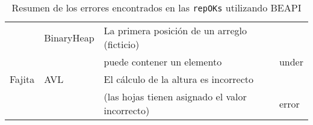 \begin{table}[H]
\begin{tabular}{ll|ll}
\cline{3-4} 
                        & BinaryHeap   & La primera posición de un arreglo (ficticio)\\&& puede contener un elemento &   under \\ 
\midrule
Fajita                  & AVL          & El cálculo de la altura es incorrecto \\&&(las hojas tienen asignado el valor incorrecto)  & error \\ 
\bottomrule
\end{tabular}
\caption{Resumen de los errores encontrados en las \texttt{repOKs} utilizando \textsf{BEAPI}}
\label{table:bugs}
\end{table}

